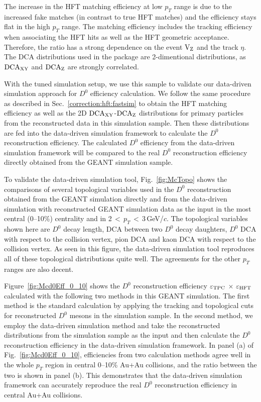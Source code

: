 \documentclass[%
 reprint,	
showpacs,
 amsmath,amssymb,
 aps,
 prc,
]{revtex4-1}
\begin{document}
The increase in the HFT matching efficiency at low $p_{T}$ range is due to the increased fake matches (in contrast to true HFT matches) and the efficiency stays flat in the high $p_{T}$ range. The matching efficiency includes the tracking efficiency when associating the HFT hits as well as the HFT geometric acceptance. Therefore, the ratio has a strong dependence on the event $\textup{V}_\textup{Z}$ and the track $\eta$. The DCA distributions used in the package are 2-dimentional distributions, as $\textup{DCA}_{\textup{XY}}$ and $\textup{DCA}_\textup{Z}$ are strongly correlated.


With the tuned simulation setup, we use this sample to validate our data-driven simulation approach for $D^0$ efficiency calculation. We follow the same procedure as described in Sec.~\ref{correction:hft:fastsim} to obtain the HFT matching efficiency as well as the 2D $\textup{DCA}_\textup{XY}$-$\textup{DCA}_\textup{Z}$ distributions for primary particles from the reconstructed data in this simulation sample. Then these distributions are fed into the data-driven simulation framework to calculate the $D^0$ reconstruction efficiency. The calculated $D^0$ efficiency from the data-driven simulation framework will be compared to the real $D^0$ reconstruction efficiency directly obtained from the GEANT simulation sample.


To validate the data-driven simulation tool, Fig.~\ref{fig:McTopo} shows the comparisons of several topological variables used in the $D^0$ reconstruction obtained from the GEANT simulation directly and from the data-driven simulation with reconstructed GEANT simulation data as the input in the most central (0--10\%) centrality and in 2\,$<$\,$p_{T}$\,$<$\,3\,GeV/$c$. The topological variables shown here are $D^0$ decay length, DCA between two $D^0$ decay daughters, $D^0$ DCA with respect to the collision vertex, pion DCA and kaon DCA with respect to the collision vertex. As seen in this figure, the data-driven simulation tool reproduces all of these topological distributions quite well. The agreements for the other $p_{T}$ ranges are also decent.

Figure~\ref{fig:Mcd0Eff_0_10} shows the $D^0$ reconstruction efficiency $\varepsilon_{\rm TPC}$ $\times$ $\varepsilon_{\rm HFT}$ calculated with the following two methods in this GEANT simulation. The first method is the standard calculation by applying the tracking and topological cuts for reconstructed $D^0$ mesons in the simulation sample. In the second method, we employ the data-driven simulation method and take the reconstructed distributions from the simulation sample as the input and then calculate the $D^0$ reconstruction efficiency in the data-driven simulation framework. In panel (a) of Fig.~\ref{fig:Mcd0Eff_0_10}, efficiencies from two calculation methods agree well in the whole $p_{T}$ region in central 0--10\% Au+Au collisions, and the ratio between the two is shown in panel (b). This demonstrates that the data-driven simulation framework can accurately reproduce the real $D^0$ reconstruction efficiency in central Au+Au collisions.
\end{document}
